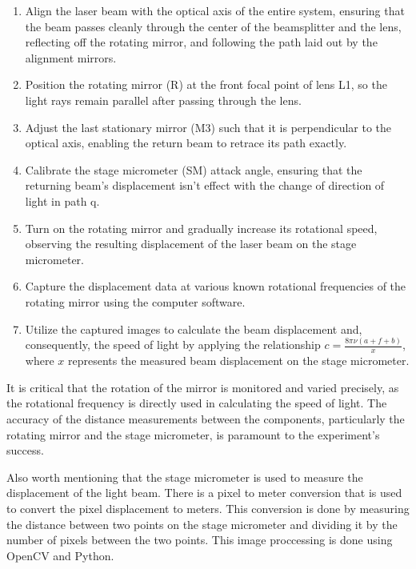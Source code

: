 \documentclass[12pt]{article}
\begin{document}
        \begin{enumerate}
            \item Align the laser beam with the optical axis of the entire system, ensuring that the beam passes cleanly through the center of the beamsplitter and the lens, reflecting off the rotating mirror, and following the path laid out by the alignment mirrors.
            \item Position the rotating mirror (R) at the front focal point of lens L1, so the light rays remain parallel after passing through the lens.
            \item Adjust the last stationary mirror (M3) such that it is perpendicular to the optical axis, enabling the return beam to retrace its path exactly.
            \item Calibrate the stage micrometer (SM) attack angle, ensuring that the returning beam's displacement isn't effect with the change of direction of light in path q.
            \item Turn on the rotating mirror and gradually increase its rotational speed, observing the resulting displacement of the laser beam on the stage micrometer.
            \item Capture the displacement data at various known rotational frequencies of the rotating mirror using the computer software.
            \item Utilize the captured images to calculate the beam displacement and, consequently, the speed of light by applying the relationship \( c = \frac{8\pi \nu (a + f + b)}{x} \), where \( x \) represents the measured beam displacement on the stage micrometer.
        \end{enumerate}
        
        It is critical that the rotation of the mirror is monitored and varied precisely, as the rotational 
        frequency is directly used in calculating the speed of light. The accuracy of the distance 
        measurements between the components, particularly the rotating mirror and the stage micrometer, 
        is paramount to the experiment's success.

        Also worth mentioning that the stage micrometer is used to measure the displacement of the light beam.
        There is a pixel to meter conversion that is used to convert the pixel displacement to meters. This conversion
        is done by measuring the distance between two points on the stage micrometer and dividing it by the number of pixels
        between the two points. This image proccessing is done using OpenCV and Python.
        
\end{document}
